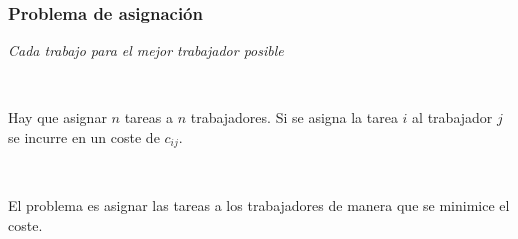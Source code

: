 \documentclass{beamer}
\begin{document}
\begin{frame}
\frametitle{Problema de asignación}


\begin{center}
\textit{Cada trabajo para el mejor trabajador posible}
\end{center}


\

Hay que asignar $n$ tareas a $n$ trabajadores. Si se asigna la tarea $i$ al trabajador $j$ se incurre en un coste de $c_{ij}$.


\

El problema es asignar las tareas a los trabajadores de manera que se minimice el coste.




\end{frame}
\end{document}
